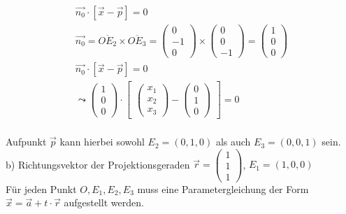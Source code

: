 	\begin{gather}
	\vec{n_0} \cdot [\vec{x}-\vec{p}]=0\\
	\vec{n_0}= \overline{OE_2} \times \overline{OE_3}=	
	\begin{pmatrix}
	0\\-1\\0
	\end{pmatrix}
	\times
	\begin{pmatrix}
	0\\0\\-1
	\end{pmatrix}
	=
	\begin{pmatrix}
	1\\0\\0
	\end{pmatrix}\\
		\vec{n_0} \cdot [\vec{x}-\vec{p}]=0\\ \leadsto 
		\begin{pmatrix}
		1\\0\\0
		\end{pmatrix} \cdot
		\begin{bmatrix}
		\begin{pmatrix}
		x_1\\x_2\\x_3
		\end{pmatrix}
		-
		\begin{pmatrix}
		0\\1\\0
		\end{pmatrix}
		\end{bmatrix}
		=0
\end{gather}\\

Aufpunkt \ensuremath{\vec{p}} kann hierbei sowohl  \ensuremath{E_2=(0,1,0)} als auch \ensuremath{E_3 = (0,0,1)} sein.\\

b) Richtungsvektor der Projektionsgeraden \ensuremath{\vec{r}=\begin{pmatrix}
		1\\1\\1
\end{pmatrix}}, \ensuremath{E_1 =(1,0,0)}\\

Für jeden Punkt \ensuremath{O,E_1,E_2,E_3} muss eine Parametergleichung der Form \ensuremath{\vec{x} = \vec{a}+t\cdot \vec{r}} aufgestellt werden.

